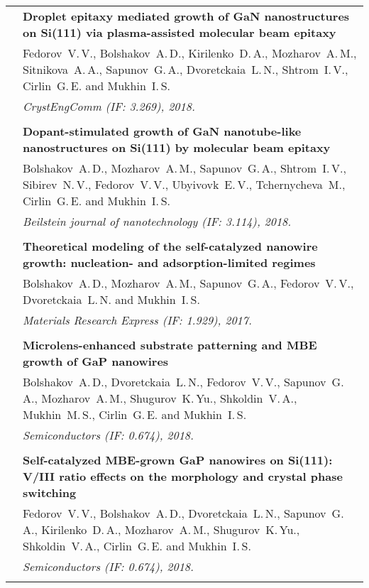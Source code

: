 \documentclass[letterpaper, 11pt]{article}
\begin{document}
\begin{longtable}{p{1.3in}p{4.8in}}
        & \textbf{Droplet epitaxy mediated growth of GaN nanostructures on
        Si(111) via plasma-assisted molecular beam epitaxy} \\
        & Fedorov~V.\,V., Bolshakov~A.\,D., Kirilenko~D.\,A., Mozharov~A.\,M.,
        Sitnikova~A.\,A., Sapunov~G.\,A., Dvoretckaia~L.\,N., Shtrom~I.\,V.,
        Cirlin~G.\,E. and Mukhin~I.\,S. \\
        & \textit{CrystEngComm (IF: 3.269), 2018.}\\
		& \\

        & \textbf{Dopant-stimulated growth of GaN nanotube-like nanostructures
        on Si(111) by molecular beam epitaxy} \\
        & Bolshakov~A.\,D., Mozharov~A.\,M., Sapunov~G.\,A., Shtrom~I.\,V.,
        Sibirev~N.\,V., Fedorov~V.\,V., Ubyivovk~E.\,V., Tchernycheva~M.,
        Cirlin~G.\,E. and Mukhin~I.\,S. \\
        & \textit{Beilstein journal of nanotechnology (IF: 3.114), 2018.}\\
		& \\

		\nohyphens{\color{OliveGreen}{Q2 Publications}}
        & \textbf{Theoretical modeling of the self-catalyzed nanowire growth:
        nucleation- and adsorption-limited regimes} \\
        & Bolshakov~A.\,D., Mozharov~A.\,M., Sapunov~G.\,A., Fedorov~V.\,V.,
        Dvoretckaia~L.\,N. and Mukhin~I.\,S. \\
        & \textit{Materials Research Express (IF: 1.929), 2017.}\\
		& \\

		\nohyphens{\color{OliveGreen}{Q3 Publications}}
        & \textbf{Microlens-enhanced substrate patterning and MBE growth of GaP
        nanowires} \\
        & Bolshakov~A.\,D., Dvoretckaia~L.\,N., Fedorov~V.\,V., Sapunov~G.\,A.,
        Mozharov~A.\,M., Shugurov~K.\,Yu., Shkoldin~V.\,A., Mukhin~M.\,S.,
        Cirlin~G.\,E. and Mukhin~I.\,S. \\
		& \textit{Semiconductors (IF: 0.674), 2018.}\\
		& \\

        & \textbf{Self-catalyzed MBE-grown GaP nanowires on Si(111): V/III
        ratio effects on the morphology and crystal phase switching} \\
        & Fedorov~V.\,V., Bolshakov~A.\,D., Dvoretckaia~L.\,N., Sapunov~G.\,A.,
        Kirilenko~D.\,A., Mozharov~A.\,M., Shugurov~K.\,Yu., Shkoldin~V.\,A.,
        Cirlin~G.\,E. and Mukhin~I.\,S. \\
		& \textit{Semiconductors (IF: 0.674), 2018.}\\
		& \\
		

\end{longtable}
\end{document}
